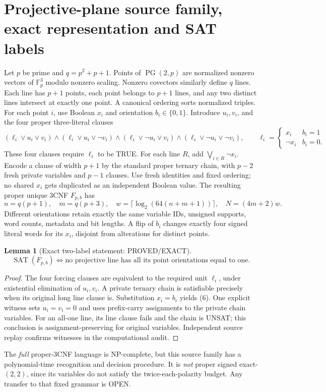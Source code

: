 \documentclass[11pt]{article}
\newtheorem{lemma}{Lemma}
\begin{document}
\section{Projective-plane source family, exact representation and SAT labels}
Let $p$ be prime and $q=p^2+p+1$. Points of $\operatorname{PG}(2,p)$ are normalized nonzero vectors of $\mathbb F_p^3$ modulo nonzero scaling. Nonzero covectors similarly define $q$ lines. Each line has $p+1$ points, each point belongs to $p+1$ lines, and any two distinct lines intersect at exactly one point. A canonical ordering sorts normalized triples. For each point $i$, use Boolean $x_i$ and orientation $b_i\in\{0,1\}$. Introduce $u_i,v_i$, and the four proper three-literal clauses
\[
(\ell_i\vee u_i\vee v_i)\wedge(\ell_i\vee u_i\vee\neg v_i)
\wedge(\ell_i\vee\neg u_i\vee v_i)
\wedge(\ell_i\vee\neg u_i\vee\neg v_i),\qquad
\ell_i=\begin{cases}x_i&b_i=1\\\neg x_i&b_i=0.\end{cases}
\tag{4}
\]
These four clauses require $\ell_i$ to be TRUE. For each line $R$, add
$\bigvee_{i\in R}\neg x_i$. Encode a clause of width $p+1$ by the standard proper ternary chain, with $p-2$ fresh private variables and $p-1$ clauses. Use fresh identities and fixed ordering; no shared $x_i$ gets duplicated as an independent Boolean value. The resulting proper unique 3CNF $F_{p,b}$ has
\[
n=q(p+1),\quad m=q(p+3),\quad
w=\lceil\log_2(64(n+m+1))\rceil,\quad N=(4m+2)w.
\tag{5}
\]
Different orientations retain exactly the same variable IDs, unsigned supports, word counts, metadata and bit lengths. A flip of $b_i$ changes exactly four signed literal words for its $x_i$, disjoint from alterations for distinct points.
\begin{lemma}[Exact two-label statement: PROVED/EXACT]
\[
\boxed{\operatorname{SAT}(F_{p,b})\iff
\text{no projective line has all its point orientations equal to one}.}
\tag{6}
\]
\end{lemma}
\begin{proof}
The four forcing clauses are equivalent to the required unit $\ell_i$, under existential elimination of $u_i,v_i$. A private ternary chain is satisfiable precisely when its original long line clause is. Substitution $x_i=b_i$ yields (6). One explicit witness sets $u_i=v_i=0$ and uses prefix-carry assignments to the private chain variables. For an all-one line, its line clause fails and the chain is UNSAT; this conclusion is assignment-preserving for original variables. Independent source replay confirms witnesses in the computational audit.
\end{proof}
The \emph{full} proper-3CNF language is NP-complete, but this source family has a polynomial-time recognition and decision procedure. It is \emph{not} proper signed exact-$(2,2)$, since its variables do not satisfy the twice-each-polarity budget. Any transfer to that fixed grammar is OPEN.
\end{document}
